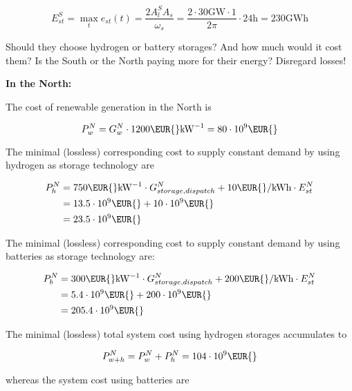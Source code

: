 \documentclass[11pt,a4paper,fleqn]{scrartcl}
\newcommand{\eur}{\text{\EUR{}}}
\begin{document}
\begin{enumerate}[(a)]
 \begin{equation*}
  E_{st}^S = \max_t e_{st}(t) = \frac{2A^S_lA_s}{\omega_s} = \frac{2\cdot 30 \si{\giga\watt}\cdot 1}{2\pi} \cdot 24 \si{\hour} = 230 \si{\giga\watt\hour}
 \end{equation*}

 \begin{shaded}\item Should they choose hydrogen or battery storages? And how much would it cost them? Is the South or the North paying more for their energy? Disregard losses!\end{shaded}

 \textbf{In the North:}

 The cost of renewable generation in the North is

 $$P_w^N=G^N_w \cdot 1200 \text{\EUR{}}\si{\per\kilo\watt}=80\cdot10^9\text{\EUR{}} $$

 The minimal (lossless) corresponding cost to supply constant demand by using hydrogen as storage technology are

 \begin{align*}
  P_h^N & = 750 \text{\EUR{}}\si{\per\kilo\watt} \cdot G_{storage,dispatch}^N + 10 \text{\EUR{}}/\text{kWh} \cdot E_{st}^N \\
        & = 13.5 \cdot 10^9 \eur + 10 \cdot 10^9 \eur                                                                                  \\
        & = 23.5 \cdot 10^9 \eur
 \end{align*}

 The minimal (lossless) corresponding cost to supply constant demand by using batteries as storage technology are:

 \begin{align*}
  P_b^N & = 300 \text{\EUR{}}\si{\per\kilo\watt} \cdot G_{storage,dispatch}^N + 200 \text{\EUR{}/kWh} \cdot E_{st}^N \\
        & = 5.4 \cdot 10^9 \eur + 200 \cdot 10^9 \eur                                                                                   \\
        & = 205.4 \cdot 10^9 \eur
 \end{align*}

 The minimal (lossless) total system cost using hydrogen storages accumulates to

 $$P_{w+h}^N = P_w^N + P_h^N = 104 \cdot 10^9\eur$$

 whereas the system cost using batteries are


\end{enumerate}
\end{document}
